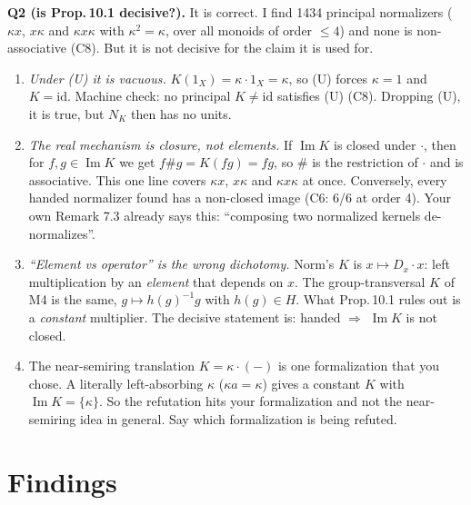 \documentclass[11pt]{article}
\renewcommand{\Im}{\operatorname{Im}}
\begin{document}
\textbf{Q2 (is Prop.\,10.1 decisive?).} It is correct. I find 1434 principal normalizers
($\kappa x$, $x\kappa$ and $\kappa x\kappa$ with $\kappa^2=\kappa$, over all monoids of order
${\le}4$) and none is non-associative (C8). But it is not decisive for the claim it is used for.
\begin{enumerate}[label=(\roman*),leftmargin=*]
\item \emph{Under (U) it is vacuous.} $K(1_X)=\kappa\cdot 1_X=\kappa$, so (U) forces $\kappa=1$ and
  $K=\mathrm{id}$. Machine check: no principal $K\neq\mathrm{id}$ satisfies (U) (C8). Dropping (U), it
  is true, but $N_K$ then has no units.
\item \emph{The real mechanism is closure, not elements.} If $\Im K$ is closed under $\cdot$, then
  for $f,g\in\Im K$ we get $f\#g=K(fg)=fg$, so $\#$ is the restriction of $\cdot$ and is associative.
  This one line covers $\kappa x$, $x\kappa$ and $\kappa x\kappa$ at once. Conversely, every handed
  normalizer found has a non-closed image (C6: 6/6 at order 4). Your own Remark 7.3 already says
  this: ``composing two normalized kernels de-normalizes''.
\item \emph{``Element vs operator'' is the wrong dichotomy.} Norm's $K$ is $x\mapsto D_x\cdot x$:
  left multiplication by an \emph{element} that depends on $x$. The group-transversal $K$ of M4 is
  the same, $g\mapsto h(g)^{-1}g$ with $h(g)\in H$. What Prop.\,10.1 rules out is a
  \emph{constant} multiplier. The decisive statement is: handed $\Rightarrow$ $\Im K$ is not closed.
\item The near-semiring translation $K=\kappa\cdot(-)$ is one formalization that you chose. A
  literally left-absorbing $\kappa$ ($\kappa a=\kappa$) gives a constant $K$ with
  $\Im K=\{\kappa\}$. So the refutation hits your formalization and not the near-semiring idea in
  general. Say which formalization is being refuted.
\end{enumerate}

\section*{Findings}
\end{document}
